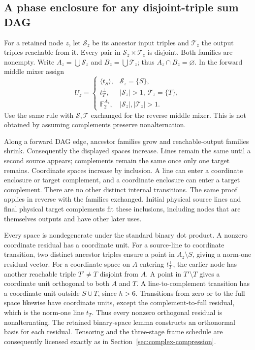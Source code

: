 \subsection{A phase enclosure for any disjoint-triple sum DAG}
For a retained node $z$, let $\mathcal S_z$ be its ancestor input triples
and $\mathcal T_z$ the output triples reachable from it. Every pair in
$\mathcal S_z\times\mathcal T_z$ is disjoint. Both families are nonempty.
Write $A_z=\bigcup\mathcal S_z$ and $B_z=\bigcup\mathcal T_z$; thus
$A_z\cap B_z=\varnothing$. In the forward middle mixer assign
\[
 U_z=\begin{cases}
 \langle t_S\rangle,&\mathcal S_z=\{S\},\\
 t_T^\perp,&|\mathcal S_z|>1,\ \mathcal T_z=\{T\},\\
 \mathbb F_2^{A_z},&|\mathcal S_z|,|\mathcal T_z|>1.
 \end{cases}
\]
Use the same rule with $\mathcal S,\mathcal T$ exchanged for the reverse
middle mixer. This is not obtained by assuming complements preserve
nonalternation.

Along a forward DAG edge, ancestor families grow and reachable-output
families shrink. Consequently the displayed spaces increase. Lines remain
the same until a second source appears; complements remain the same once
only one target remains. Coordinate spaces increase by inclusion. A line
can enter a coordinate enclosure or target complement, and a coordinate
enclosure can enter a target complement. There are no other distinct
internal transitions. The same proof applies in reverse with the families
exchanged. Initial physical source lines and final physical target
complements fit these inclusions, including nodes that are themselves
outputs and have other later uses.

Every space is nondegenerate under the standard binary dot product.
A nonzero coordinate residual has a coordinate unit. For a source-line
to coordinate transition, two distinct ancestor triples ensure a point in
$A_z\setminus S$, giving a norm-one residual vector. For a coordinate
space on $A$ entering $t_T^\perp$, the earlier node has another reachable
triple $T'\ne T$ disjoint from $A$. A point in $T'\setminus T$ gives a
coordinate unit orthogonal to both $A$ and $T$. A line-to-complement
transition has a coordinate unit outside $S\cup T$, since $h>6$.
Transitions from zero or to the full space likewise have coordinate units,
except the complement-to-full residual, which is the norm-one line $t_T$.
Thus every nonzero orthogonal residual is nonalternating. The retained
binary-space lemma constructs an orthonormal basis for each residual.
Tensoring and the three-stage frame schedule are consequently licensed
exactly as in Section~\ref{sec:complex-compression}.

